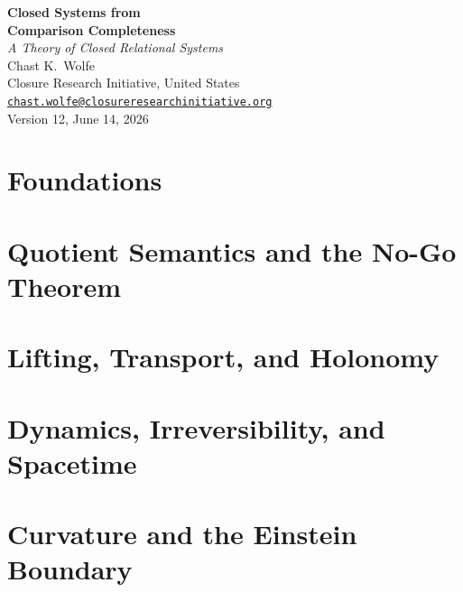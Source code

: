 \documentclass[12pt,openany]{book}
\numberwithin{equation}{section}
\theoremstyle{plain}
\theoremstyle{definition}
\theoremstyle{remark}
\begin{document}
\pagestyle{plain}
\sloppy
\frontmatter
\begin{titlepage}
	\centering
	\vspace*{3cm}
	{\Huge\bfseries Closed Systems from\\[6pt] Comparison Completeness}\\[1.5cm]
	{\Large\itshape A Theory of Closed Relational Systems}\\[10pt]
	{\Large Chast K.~Wolfe}\\[0.55cm]
	{\large Closure Research Initiative, United States}\\[4pt]
	{\normalsize \href{mailto:chast.wolfe@closureresearchinitiative.org}{\texttt{chast.wolfe@closureresearchinitiative.org}}}\\[0.6cm]
	{\normalsize Version 12, June 14, 2026}\\[2cm]
	\vfill
\end{titlepage}



\tableofcontents





\mainmatter
\pagestyle{crimain}

\part{Foundations}



\part{Quotient Semantics and the No-Go Theorem}



\part{Lifting, Transport, and Holonomy}






\part{Dynamics, Irreversibility, and Spacetime}



\part{Curvature and the Einstein Boundary}







\end{document}
